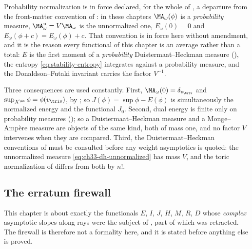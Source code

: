 \begin{warning}{Probability normalization is in force}
\label{warn:ch50-normalization}
 declared, for the whole of
, a departure from the
front-matter convention of : in these chapters
$\MA_\omega(\phi)$ is a \emph{probability} measure, $\MA^{\mathrm u}_\omega
=V\MA_\omega$ is the unnormalized one, $E_\omega(0)=0$ and
$E_\omega(\phi+c)=E_\omega(\phi)+c$.  That convention is in force here
without amendment, and it is the reason every functional of this chapter is
an average rather than a total: $E$ is the first moment of a
\emph{probability} Duistermaat--Heckman measure
(), the entropy \eqref{eq:stability-entropy}
integrates against a probability measure, and the Donaldson--Futaki
invariant carries the factor $V^{-1}$.

Three consequences are used constantly.  First, $\MA_\omega(0)
=\delta_{v_{\triv}}$ and $\sup_{X^{\An}}\phi=\phi(v_{\triv})$, by
; so $J(\phi)=\sup\phi-E(\phi)$ is
simultaneously the normalized energy and the functional $J_0$.  Second,
dual energy is finite only on probability measures
(); so a Duistermaat--Heckman measure and a
Monge--Amp\`ere measure are objects of the same kind, both of mass one, and
no factor $V$ intervenes when they are compared.  Third, the
Duistermaat--Heckman conventions of  must
be consulted before any weight asymptotics is quoted: the unnormalized
measure \eqref{eq:ch33-dh-unnormalized} has mass $V$, and the toric
normalization of  differs from both by
$n!$.
\end{warning}

\subsection{The erratum firewall}
\label{sec:ch50-firewall}

This chapter is about exactly the functionals $E$, $I$, $J$, $H$,
$M$, $R$, $D$ whose \emph{complex} asymptotic slopes along rays were
the subject of \cite{BHJ19}, part of which was retracted.  The firewall is
therefore not a formality here, and it is stated before anything else is
proved.

